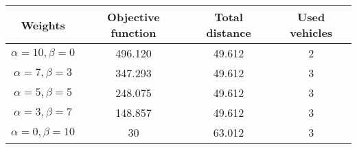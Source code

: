{
\renewcommand{\arraystretch}{2}
\begin{longtable}[h]{| c | c | c | c |}
    \hline
    \textbf{Weights} & \textbf{Objective function} & \textbf{Total distance} & \textbf{Used vehicles} \\
    \hline
    \endhead
    $\alpha = 10, \beta = 0$ & 496.120 & 49.612 & 2 \\
    \hline
    $\alpha = 7, \beta = 3$  & 347.293 & 49.612 & 3 \\
    \hline
    $\alpha = 5, \beta = 5$  & 248.075 & 49.612 & 3 \\
    \hline
    $\alpha = 3, \beta = 7$  & 148.857 & 49.612 & 3 \\
    \hline
    $\alpha = 0, \beta = 10$ &      30 & 63.012 & 3 \\
    \hline
\end{longtable}
}
